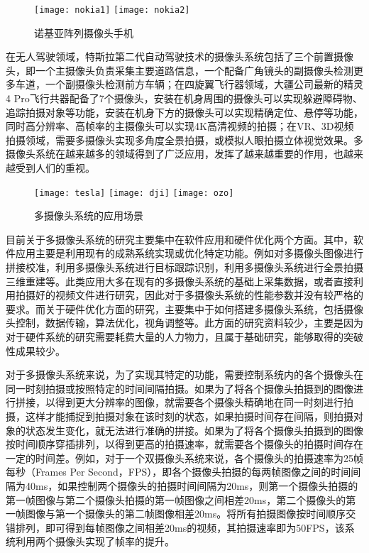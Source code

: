\begin{figure}[h]
  \centering%
    {\texttt{[image: nokia1]}}
    {\texttt{[image: nokia2]}}
  \caption{诺基亚阵列摄像头手机}
  \label{nokia}
\end{figure}

在无人驾驶领域，特斯拉第二代自动驾驶技术的摄像头系统包括了三个前置摄像头，即一个主摄像头负责采集主要道路信息，一个配备广角镜头的副摄像头检测更多车道，一个副摄像头检测前方车辆；在四旋翼飞行器领域，大疆公司最新的精灵4 Pro飞行共器配备了7个摄像头，安装在机身周围的摄像头可以实现躲避障碍物、追踪拍摄对象等功能，安装在机身下方的摄像头可以实现精确定位、悬停等功能，同时高分辨率、高帧率的主摄像头可以实现4K高清视频的拍摄；在VR、3D视频拍摄领域，需要多摄像头实现多角度全景拍摄，或模拟人眼拍摄立体视觉效果。多摄像头系统在越来越多的领域得到了广泛应用，发挥了越来越重要的作用，也越来越受到人们的重视。

\begin{figure}[h]
  \centering%
    {\texttt{[image: tesla]}}
    {\texttt{[image: dji]}}
    {\texttt{[image: ozo]}}
  \caption{多摄像头系统的应用场景}
  \label{camera}
\end{figure}


目前关于多摄像头系统的研究主要集中在软件应用和硬件优化两个方面。其中，软件应用主要是利用现有的成熟系统实现或优化特定功能。例如对多摄像头图像进行拼接校准，利用多摄像头系统进行目标跟踪识别，利用多摄像头系统进行全景拍摄三维重建等。此类应用大多在现有的多摄像头系统的基础上采集数据，或者直接利用拍摄好的视频文件进行研究，因此对于多摄像头系统的性能参数并没有较严格的要求。而关于硬件优化方面的研究，主要集中于如何搭建多摄像头系统，包括摄像头控制，数据传输，算法优化，视角调整等。此方面的研究资料较少，主要是因为对于硬件系统的研究需要耗费大量的人力物力，且属于基础研究，能够取得的突破性成果较少。

对于多摄像头系统来说，为了实现其特定的功能，需要控制系统内的各个摄像头在同一时刻拍摄或按照特定的时间间隔拍摄。如果为了将各个摄像头拍摄到的图像进行拼接，以得到更大分辨率的图像，就需要各个摄像头精确地在同一时刻进行拍摄，这样才能捕捉到拍摄对象在该时刻的状态，如果拍摄时间存在间隔，则拍摄对象的状态发生变化，就无法进行准确的拼接。如果为了将各个摄像头拍摄到的图像按时间顺序穿插排列，以得到更高的拍摄速率，就需要各个摄像头的拍摄时间存在一定的时间差。例如，对于一个双摄像头系统来说，各个摄像头的拍摄速率为25帧每秒（Frames Per Second，FPS），即各个摄像头拍摄的每两帧图像之间的时间间隔为40ms，如果控制两个摄像头的拍摄时间间隔为20ms，则第一个摄像头拍摄的第一帧图像与第二个摄像头拍摄的第一帧图像之间相差20ms，第二个摄像头的第一帧图像与第一个摄像头的第二帧图像相差20ms。将所有拍摄图像按时间顺序交错排列，即可得到每帧图像之间相差20ms的视频，其拍摄速率即为50FPS，该系统利用两个摄像头实现了帧率的提升。

